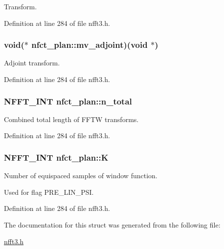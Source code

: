 Transform. 



Definition at line 284 of file nfft3.\-h.

\hypertarget{structnfct__plan_aab8ee071a4e254cbf94a03689ed3127f}{
\subsubsection[{mv\-\_\-adjoint}]{\setlength{\rightskip}{0pt plus 5cm}void($\ast$ nfct\-\_\-plan\-::mv\-\_\-adjoint)(void $\ast$)}}\label{structnfct__plan_aab8ee071a4e254cbf94a03689ed3127f}


Adjoint transform. 



Definition at line 284 of file nfft3.\-h.

\hypertarget{structnfct__plan_a68ddfb06f47a32b4b7bd2ce6c86e430f}{
\subsubsection[{n\-\_\-total}]{\setlength{\rightskip}{0pt plus 5cm}N\-F\-F\-T\-\_\-\-I\-N\-T nfct\-\_\-plan\-::n\-\_\-total}}\label{structnfct__plan_a68ddfb06f47a32b4b7bd2ce6c86e430f}


Combined total length of F\-F\-T\-W transforms. 



Definition at line 284 of file nfft3.\-h.

\hypertarget{structnfct__plan_ac1707afe9f0d6b288a6329bec05048cc}{
\subsubsection[{K}]{\setlength{\rightskip}{0pt plus 5cm}N\-F\-F\-T\-\_\-\-I\-N\-T nfct\-\_\-plan\-::\-K}}\label{structnfct__plan_ac1707afe9f0d6b288a6329bec05048cc}


Number of equispaced samples of window function. 

Used for flag P\-R\-E\-\_\-\-L\-I\-N\-\_\-\-P\-S\-I. 

Definition at line 284 of file nfft3.\-h.



The documentation for this struct was generated from the following file\-:\begin{DoxyCompactItemize}
\item 
\hyperlink{nfft3_8h}{nfft3.\-h}\end{DoxyCompactItemize}
